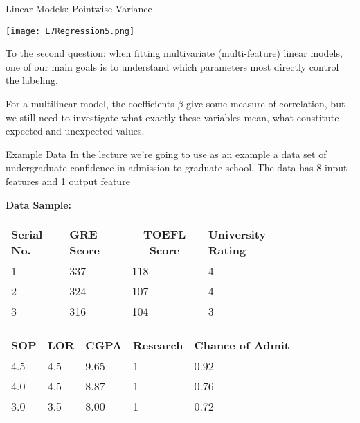 \documentclass[10pt, table, dvipsnames,xcdraw, handout ]{beamer}
\begin{document}
\begin{frame}[fragile]{Linear Models: Pointwise Variance}
  \begin{minipage}[t][0.5\textheight][t]{\textwidth}
	\centering \texttt{[image: L7Regression5.png]} 
  \end{minipage}
  \vfill
\begin{minipage}[t][0.5\textheight][t]{\textwidth}
To the second question: when fitting multivariate (multi-feature) linear models, one of our main goals is to understand which parameters most directly control the labeling. \pause\newline  

For a multilinear model, the coefficients $\beta$ give some measure of correlation, but we still need to investigate what exactly these variables mean, what constitute expected and unexpected values.

\end{minipage}
\end{frame}




\begin{frame}[fragile]{Example Data}
In the lecture we're going to use as an example a data set of undergraduate confidence in admission to graduate school. The data has 8 input features and 1 output feature\newline 

\textbf{Data Sample:}\newline 


\begin{tabular}{lllllllll}
\hline
\textbf{Serial No.} & \textbf{GRE Score} & \multicolumn{1}{c}{\textbf{TOEFL Score}} & \textbf{University Rating} \\ \hline
1                   & 337                & 118                                      & 4                         \\
2                   & 324                & 107                                      & 4                         \\
3                   & 316                & 104                                      & 3                         
\end{tabular}


\begin{tabular}{lllllllll}
\hline
\textbf{SOP} & \textbf{LOR} & \textbf{CGPA} & \textbf{Research} & \textbf{Chance of Admit} \\ \hline
4.5          & 4.5          & 9.65          & 1                 & 0.92                     \\
4.0          & 4.5          & 8.87          & 1                 & 0.76                     \\
3.0          & 3.5          & 8.00          & 1                 & 0.72                    
\end{tabular}

\end{frame}
\end{document}
